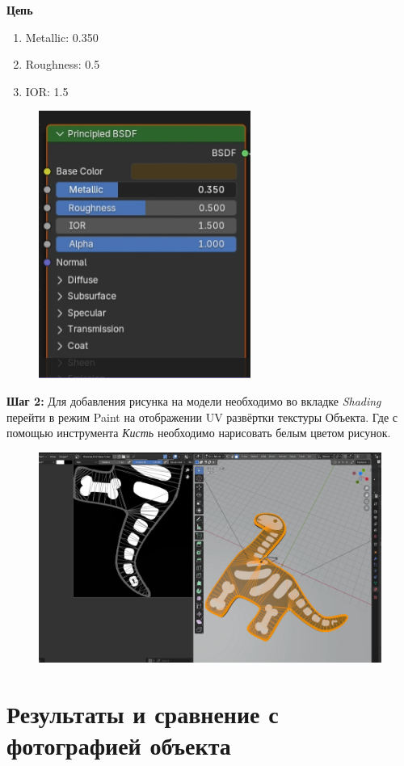 \documentclass[areasetadvanced]{scrartcl}
\begin{document}
\par \textbf{Цепь}
\begin{enumerate}
    \item Metallic: 0.350
    \item Roughness: 0.5
    \item IOR: 1.5
\end{enumerate}

\begin{figure}[H]
    \label{4} 
    \centering
    \includegraphics[width=0.4\linewidth]{dino/16.png}
\end{figure}


\par \textbf{Шаг 2:} Для добавления рисунка на модели необходимо во вкладке \textit{Shading} перейти в режим Paint на отображении UV развёртки текстуры Объекта. Где с помощью инструмента \textit{Кисть} необходимо нарисовать белым цветом рисунок.
\begin{figure}[H]
    \label{4} 
    \centering
    \includegraphics[width=0.8\linewidth]{dino/17.png}
\end{figure}


\newpage
\section{Результаты и сравнение с фотографией объекта}
\end{document}
